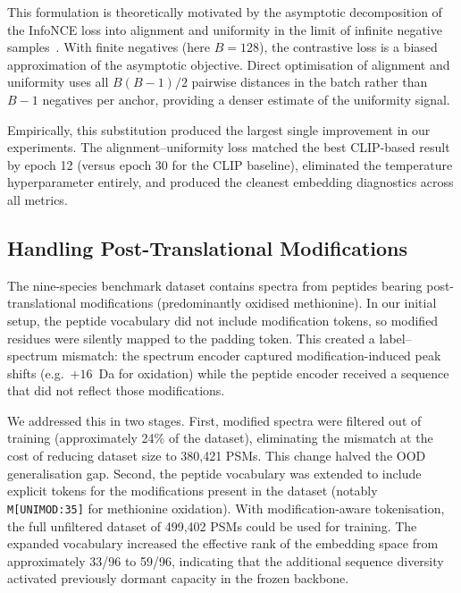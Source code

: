 \documentclass[pdflatex,sn-mathphys-num]{sn-jnl}%
\theoremstyle{thmstyleone}%
\theoremstyle{thmstyletwo}%
\theoremstyle{thmstylethree}%
\begin{document}
This formulation is theoretically motivated by the asymptotic decomposition of the InfoNCE loss into alignment and uniformity in the limit of infinite negative samples~\cite{wang2020understanding}. With finite negatives (here $B = 128$), the contrastive loss is a biased approximation of the asymptotic objective. Direct optimisation of alignment and uniformity uses all $B(B-1)/2$ pairwise distances in the batch rather than $B-1$ negatives per anchor, providing a denser estimate of the uniformity signal.

Empirically, this substitution produced the largest single improvement in our experiments. The alignment--uniformity loss matched the best CLIP-based result by epoch 12 (versus epoch 30 for the CLIP baseline), eliminated the temperature hyperparameter entirely, and produced the cleanest embedding diagnostics across all metrics.

\subsection{Handling Post-Translational Modifications}
\label{subsec:ptm}

The nine-species benchmark dataset contains spectra from peptides bearing post-translational modifications (predominantly oxidised methionine). In our initial setup, the peptide vocabulary did not include modification tokens, so modified residues were silently mapped to the padding token. This created a label--spectrum mismatch: the spectrum encoder captured modification-induced peak shifts (e.g.\ $+16$~Da for oxidation) while the peptide encoder received a sequence that did not reflect those modifications.

We addressed this in two stages. First, modified spectra were filtered out of training (approximately 24\% of the dataset), eliminating the mismatch at the cost of reducing dataset size to 380{,}421 PSMs. This change halved the OOD generalisation gap. Second, the peptide vocabulary was extended to include explicit tokens for the modifications present in the dataset (notably \texttt{M[UNIMOD:35]} for methionine oxidation). With modification-aware tokenisation, the full unfiltered dataset of 499{,}402 PSMs could be used for training. The expanded vocabulary increased the effective rank of the embedding space from approximately 33/96 to 59/96, indicating that the additional sequence diversity activated previously dormant capacity in the frozen backbone.
\end{document}
